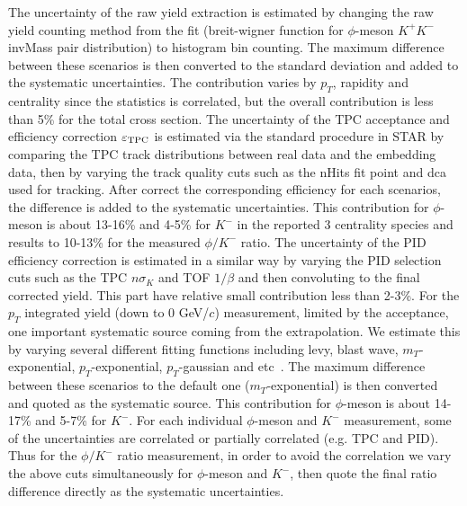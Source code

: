 \documentclass[%
 reprint,	
showpacs,
 amsmath,amssymb,
 aps,
 prc,
]{revtex4-1}
\begin{document}
The uncertainty of the raw yield extraction is estimated by changing the raw yield counting method from the fit (breit-wigner function for $\phi$-meson $K^+K^-$ invMass pair distribution) to histogram bin counting. The maximum difference between these scenarios is then converted to the standard deviation and added to the systematic uncertainties. The contribution varies by $p_T$, rapidity and centrality since the statistics is correlated, but the overall contribution is less than 5\% for the total cross section. The uncertainty of the TPC acceptance and efficiency correction $\varepsilon_{\rm TPC}$ is estimated via the standard procedure in STAR by comparing the TPC track distributions between real data and the embedding data, then by varying the track quality cuts such as the nHits fit point and dca used for tracking. After correct the corresponding efficiency for each scenarios, the difference is added to the systematic uncertainties. This contribution for $\phi$-meson is about 13-16\% and 4-5\% for $K^-$ in the reported 3 centrality species and results to 10-13\% for the measured $\phi/K^-$ ratio. The uncertainty of the PID efficiency correction is estimated in a similar way by varying the PID selection cuts such as the TPC $n\sigma_{K}$ and TOF $1/\beta$ and then convoluting to the final corrected yield. This part have relative small contribution less than 2-3\%. For the $p_T$ integrated yield (down to 0 GeV/$c$) measurement, limited by the acceptance, one important systematic source coming from the extrapolation. We estimate this by varying several different fitting functions including levy, blast wave, $m_T$-exponential, $p_T$-exponential, $p_T$-gaussian and etc~\cite{PhysRevC.79.034909}. The maximum difference between these scenarios to the default one ($m_T$-exponential) is then converted and quoted as the systematic source. This contribution for $\phi$-meson is about 14-17\% and 5-7\% for $K^-$. For each individual $\phi$-meson and $K^-$ measurement, some of the uncertainties are correlated or partially correlated (e.g. TPC and PID). Thus for the $\phi/K^-$ ratio measurement, in order to avoid the correlation we vary the above cuts simultaneously for $\phi$-meson and $K^-$, then quote the final ratio difference directly as the systematic uncertainties.
\end{document}
